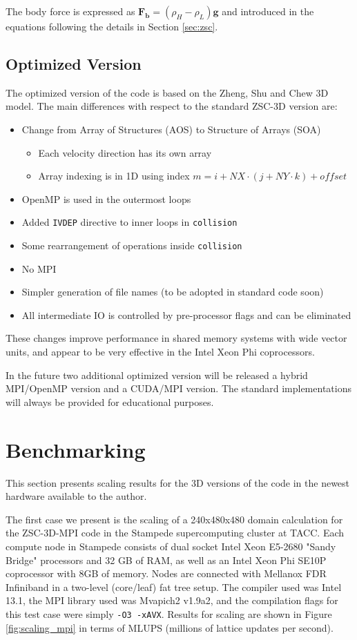 \documentclass[12pt]{report}
\newcommand{\vect}[1]{\ensuremath{\mathrm{\mathbf{#1}}}}
\begin{document}
The body force is expressed as $\vect{F_b}=(\rho_H-\rho_L)\vect{g}$ and introduced in the equations following the details in Section \ref{sec:zsc}.

\section{Optimized Version}
The optimized version of the code is based on the Zheng, Shu and Chew 3D model. The main differences with respect to the standard ZSC-3D version are:

\begin{itemize}
\item Change from Array of Structures (AOS) to Structure of Arrays (SOA)
	\begin{itemize}
	\item Each velocity direction has its own array
	\item Array indexing is in 1D using index $m=i+NX\cdot(j+NY\cdot k)+offset$
	\end{itemize}
\item OpenMP is used in the outermost loops
\item Added \verb+IVDEP+ directive to inner loops in \verb+collision+
\item Some rearrangement of operations inside \verb+collision+
\item No MPI
\item Simpler generation of file names (to be adopted in standard code soon)
\item All intermediate IO is controlled by pre-processor flags and can be eliminated
\end{itemize}

These changes improve performance in shared memory systems with wide vector units, and appear to be very effective in the Intel Xeon Phi coprocessors.

In the future two additional optimized version will be released a hybrid MPI/OpenMP version and a CUDA/MPI version. The standard implementations will always be provided for educational purposes.

\chapter{Benchmarking}
This section presents scaling results for the 3D versions of the code in the newest hardware available to the author. 

The first case we present is the scaling of a 240x480x480 domain calculation for the ZSC-3D-MPI code in the Stampede supercomputing cluster at TACC. Each compute node in Stampede consists of dual socket Intel Xeon E5-2680 "Sandy Bridge" processors and 32 GB of RAM, as well as an Intel Xeon Phi SE10P coprocessor  with 8GB of memory. Nodes are connected with  Mellanox FDR Infiniband in a two-level (core/leaf) fat tree setup. The compiler used was Intel 13.1, the MPI library used was Mvapich2 v1.9a2, and the compilation flags for this test case were simply \verb+-O3 -xAVX+. Results for scaling are shown in Figure \ref{fig:scaling_mpi} in terms of MLUPS (millions of lattice updates per second).
\end{document}

